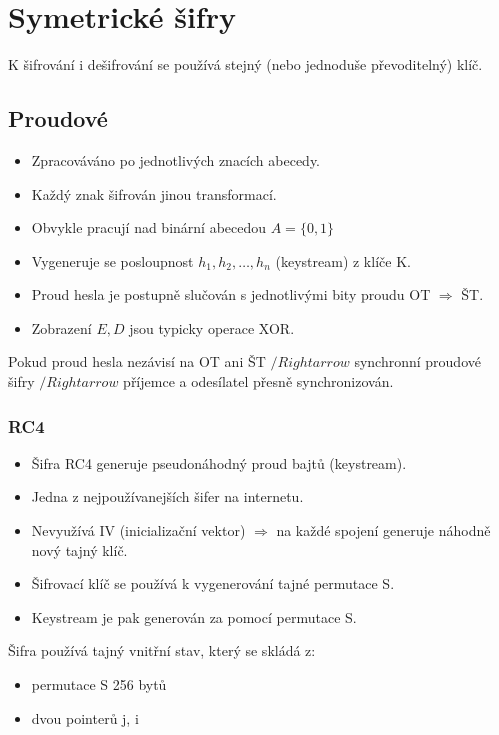 \documentclass{szzclass}
\begin{document}
\section{Symetrické šifry}
K šifrování i dešifrování se používá stejný (nebo jednoduše převoditelný) klíč.

\subsection{Proudové}
\begin{itemize}
\item Zpracováváno po jednotlivých znacích abecedy.
\item Každý znak šifrován jinou transformací.
\item Obvykle pracují nad binární abecedou $A=\{0,1\}$
\item Vygeneruje se posloupnost $h_1,h_2,\dots,h_n$ (keystream) z klíče K.
\item Proud hesla je postupně slučován s jednotlivými bity proudu OT $\Rightarrow$ ŠT.
\item Zobrazení $E, D$ jsou typicky operace XOR.
\end{itemize}

Pokud proud hesla nezávisí na OT ani ŠT $/Rightarrow$ synchronní proudové šifry $/Rightarrow$ příjemce a odesílatel přesně synchronizován.

\subsubsection{RC4}
\begin{itemize}
\item Šifra RC4 generuje pseudonáhodný proud bajtů (keystream).
\item Jedna z nejpoužívanejších šifer na internetu.
\item Nevyužívá IV (inicializační vektor) $\Rightarrow$ na každé spojení generuje náhodně nový tajný klíč.
\item Šifrovací klíč se používá k vygenerování tajné permutace S.
\item Keystream je pak generován za pomocí permutace S.
\end{itemize}

Šifra používá tajný vnitřní stav, který se skládá z:
\begin{itemize}
\item permutace S 256 bytů
\item dvou pointerů j, i
\end{itemize}
\end{document}
